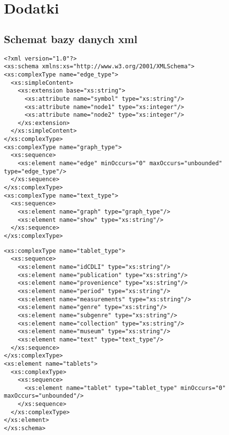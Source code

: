 \chapter*{Dodatki}
\section*{Schemat bazy danych xml}
\label{appendix:xmlsch}
\begin{verbatim}
<?xml version="1.0"?>
<xs:schema xmlns:xs="http://www.w3.org/2001/XMLSchema">
<xs:complexType name="edge_type">
  <xs:simpleContent>
    <xs:extension base="xs:string">
      <xs:attribute name="symbol" type="xs:string"/>
      <xs:attribute name="node1" type="xs:integer"/>
      <xs:attribute name="node2" type="xs:integer"/>
    </xs:extension>
  </xs:simpleContent>
</xs:complexType>
<xs:complexType name="graph_type">
  <xs:sequence>
    <xs:element name="edge" minOccurs="0" maxOccurs="unbounded" type="edge_type"/>
  </xs:sequence>
</xs:complexType>
<xs:complexType name="text_type">
  <xs:sequence>
    <xs:element name="graph" type="graph_type"/>
    <xs:element name="show" type="xs:string"/>
  </xs:sequence>
</xs:complexType>
\end{verbatim}

\begin{verbatim}
<xs:complexType name="tablet_type">
  <xs:sequence>
    <xs:element name="idCDLI" type="xs:string"/>
    <xs:element name="publication" type="xs:string"/>
    <xs:element name="provenience" type="xs:string"/>
    <xs:element name="period" type="xs:string"/>
    <xs:element name="measurements" type="xs:string"/>
    <xs:element name="genre" type="xs:string"/>
    <xs:element name="subgenre" type="xs:string"/>
    <xs:element name="collection" type="xs:string"/>
    <xs:element name="museum" type="xs:string"/>	
    <xs:element name="text" type="text_type"/>		
  </xs:sequence>
</xs:complexType>
<xs:element name="tablets">
  <xs:complexType>
    <xs:sequence>
      <xs:element name="tablet" type="tablet_type" minOccurs="0" maxOccurs="unbounded"/>
    </xs:sequence>
  </xs:complexType>
</xs:element>
</xs:schema>
\end{verbatim}